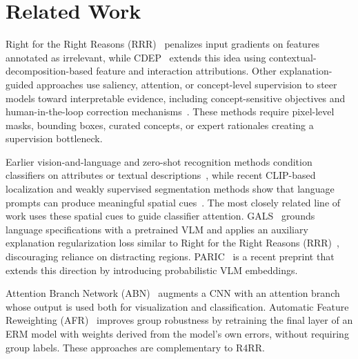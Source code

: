 \section{Related Work}
\label{sec:related}

Right for the Right Reasons (RRR)~\cite{ross2017right} penalizes input gradients on features annotated as irrelevant, while CDEP~\cite{rieger2020interpretations} extends this idea using contextual-decomposition-based feature and interaction attributions. Other explanation-guided approaches use saliency, attention, or concept-level supervision to steer models toward interpretable evidence, including concept-sensitive objectives and human-in-the-loop correction mechanisms~\cite{gupta2023concept,gao2022aligning,schramowski2020making}. These methods require pixel-level masks, bounding boxes, curated concepts, or expert rationales creating a supervision bottleneck.

Earlier vision-and-language and zero-shot recognition methods condition classifiers on attributes or textual descriptions~\cite{elhoseiny2013write,frome2013devise,lampert2013attribute,radford2021learning}, while recent CLIP-based localization and weakly supervised segmentation methods show that language prompts can produce meaningful spatial cues~\cite{lin2023clip,zhang2024frozen}. The most closely related line of work uses these spatial cues to guide classifier attention. GALS~\cite{petryk2022guiding} grounds language specifications with a pretrained VLM and applies an auxiliary explanation regularization loss similar to  Right for the Right Reasons (RRR)~\cite{ross2017right}, discouraging reliance on distracting regions. PARIC~\cite{nautiyal2025paric} is a recent preprint that extends this direction by introducing probabilistic VLM embeddings. %

Attention Branch Network (ABN)~\cite{fukui2019attention} augments a CNN with an attention branch whose output is used both for visualization and classification. Automatic Feature Reweighting (AFR)~\cite{qiu2023simple} improves group robustness by retraining the final layer of an ERM model with weights derived from the model's own errors, without requiring group labels. These approaches are complementary to R4RR. 



